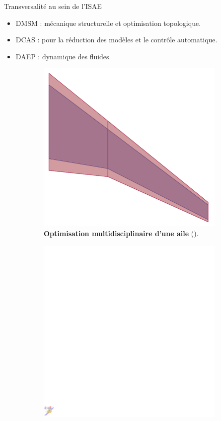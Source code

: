 \documentclass[aspectratio=169, french]{beamer}
\begin{document}
\begin{frame}{Transversalité au sein de l'ISAE}
\begin{itemize}
	\item DMSM : mécanique structurelle et optimisation topologique. 
	\item DCAS : pour la réduction des modèles et le contrôle automatique.
	\item DAEP : dynamique des fluides.
\end{itemize}
\begin{figure}[t]
	\begin{subfigure}{0.45\textwidth}
		\includegraphics[height=.45\textheight]{MDO_wing.pdf}%
		\caption*{\textbf{Optimisation multidisciplinaire d'une aile} (\cite{masColomer2021mdo}). }
	\end{subfigure}\hfill
	\begin{subfigure}{0.5\textwidth}
		\includegraphics[height=.45\textheight]{Codesign_satellite.pdf} 

\end{subfigure}
\end{figure}
\end{frame}
\end{document}
